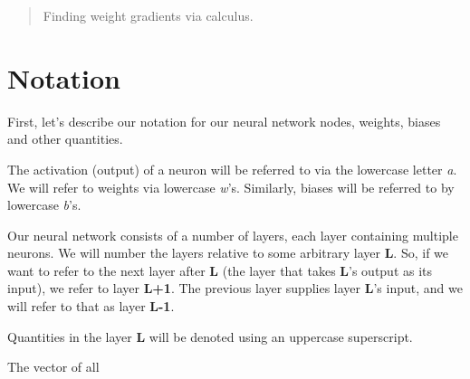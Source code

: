 \documentclass[12pt]{article}
\begin{document}
\maketitle

\begin{abstract}
Finding weight gradients via calculus.
\end{abstract}

\section{Notation}

First, let's describe our notation for our neural network nodes, weights, biases and other quantities.

The activation (output) of a neuron will be referred to via the lowercase letter \textit{a}. We will refer to weights via lowercase \textit{w}'s. Similarly, biases will be referred to by lowercase \textit{b}'s.

Our neural network consists of a number of layers, each layer containing multiple neurons. We will number the layers relative to some arbitrary layer \textbf{L}. So, if we want to refer to the next layer after \textbf{L} (the layer that takes \textbf{L}'s output as its input), we refer to layer \textbf{L+1}. The previous layer supplies layer \textbf{L}'s input, and we will refer to that as layer \textbf{L-1}.

Quantities in the layer \textbf{L} will be denoted using an uppercase superscript. 

The vector of all 




\end{document}
